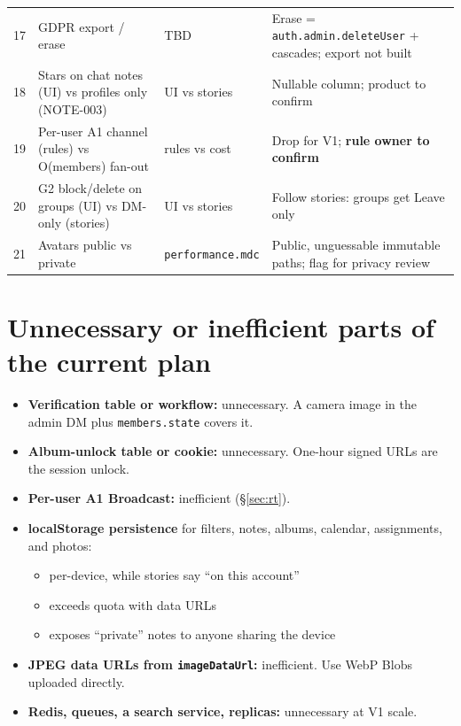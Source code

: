 \documentclass[11pt,a4paper]{article}
\newcommand{\code}[1]{\texttt{\small #1}}
\begin{document}
{\begin{longtable}{L{0.5cm} L{6cm} L{2.2cm} L{6.2cm}}
17 & GDPR export / erase & TBD & Erase = \code{auth.admin.deleteUser} + cascades; export not built\\
18 & Stars on chat notes (UI) vs profiles only (NOTE-003) & UI vs stories & Nullable column; product to confirm\\
19 & Per-user A1 channel (rules) vs O(members) fan-out & rules vs cost & Drop for V1; \textbf{rule owner to confirm}\\
20 & G2 block/delete on groups (UI) vs DM-only (stories) & UI vs stories & Follow stories: groups get Leave only\\
21 & Avatars public vs private & \code{performance.mdc} & Public, unguessable immutable paths; flag for privacy review\\
\end{longtable}
}

\section{Unnecessary or inefficient parts of the current plan}
\begin{itemize}
  \item \textbf{Verification table or workflow:} unnecessary. A camera image in the admin DM plus
        \code{members.state} covers it.
  \item \textbf{Album-unlock table or cookie:} unnecessary. One-hour signed URLs are the session unlock.
  \item \textbf{Per-user A1 Broadcast:} inefficient (\S\ref{sec:rt}).
  \item \textbf{localStorage persistence} for filters, notes, albums, calendar, assignments, and photos:
        \begin{itemize}
          \item per-device, while stories say ``on this account''
          \item exceeds quota with data URLs
          \item exposes ``private'' notes to anyone sharing the device
        \end{itemize}
  \item \textbf{JPEG data URLs from \code{imageDataUrl}:} inefficient. Use WebP Blobs uploaded directly.
  \item \textbf{Redis, queues, a search service, replicas:} unnecessary at V1 scale.
\end{itemize}
\end{document}
